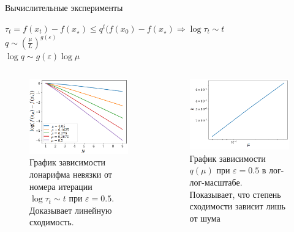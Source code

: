 \documentclass{beamer}
\begin{document}
\begin{frame}{Вычислительные эксперименты}
\begin{center}
$\tau_t = f(x_{t}) - f(x_{\star}) \le q^t (f(x_0) - f(x_{\star}) \Rightarrow \log{\tau_t} \sim t$ \\

 $q \sim (\frac{\mu}{L})^{g(\varepsilon)}$ \\ 
 
 $\log{q} \sim g(\varepsilon) \log{\mu}$
\end{center}

\begin{columns}[c]
\begin{figure}
\includegraphics[width=1.0\textwidth]{linear_convergence.png}
    \caption{График зависимости лонарифма невязки от номера итерации $\log{\tau_t} \sim t$ при $\varepsilon = 0.5$. Доказывает линейную сходимость.}
\end{figure}
\begin{figure}
\includegraphics[width=1.0\textwidth]{q_mu_grqph.png}
    \caption{График зависимости $q(\mu)$ при $\varepsilon = 0.5$ в лог-лог-масштабе. Показывает, что степень сходимости зависит лишь от шума}
\end{figure}
\end{columns}
\end{frame}
\end{document}

